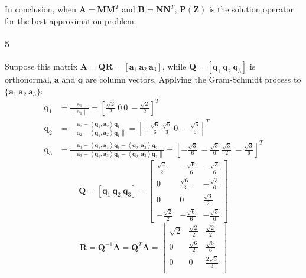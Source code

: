 \documentclass[22pt]{article}
\begin{document}
	In conclusion, when $\mathbf{A = MM}^T$ and $\mathbf{B=NN}^T$, $\mathbf{P(Z)}$ is the solution operator for the best approximation problem.

	\paragraph{5} Suppose this matrix $\mathbf{A} = \mathbf{QR} = [\mathbf{a}_1\ \mathbf{a}_2\ \mathbf{a}_3]$, while $\mathbf{Q} = [\mathbf{q}_1\ \mathbf{q}_2\ \mathbf{q}_3]$ is orthonormal, $\mathbf{a}$ and $\mathbf{q}$ are column vectors. Applying the Gram-Schmidt process to $\{\mathbf{a}_1\ \mathbf{a}_2\ \mathbf{a}_3\}$:
	\begin{align}
		\mathbf{q}_1 & = \frac{\mathbf{a}_1}{\left\|\mathbf{a}_1\right\|} = [\frac{\sqrt{2}}{2}\ 0\ 0\ -\frac{\sqrt{2}}{2}]^T \\
		\mathbf{q}_2 & = \frac{\mathbf{a}_2- \left \langle\mathbf{q}_1,\mathbf{a}_2\right \rangle\mathbf{q}_1}{\left\|\mathbf{a}_2- \left \langle\mathbf{q}_1,\mathbf{a}_2\right \rangle\mathbf{q}_1\right\|} = [-\frac{\sqrt{6}}{6}\ \frac{\sqrt{6}}{3}\ 0\ -\frac{\sqrt{6}}{6}]^T\\
		\mathbf{q}_3 & = \frac{\mathbf{a}_3- \left \langle\mathbf{q}_1,\mathbf{a}_3\right \rangle\mathbf{q}_1-\left \langle\mathbf{q}_2,\mathbf{a}_3\right \rangle\mathbf{q}_2}{\left\|\mathbf{a}_3- \left \langle\mathbf{q}_1,\mathbf{a}_3\right \rangle\mathbf{q}_1-\left \langle\mathbf{q}_2,\mathbf{a}_3\right \rangle\mathbf{q}_2 \right\|} = [-\frac{\sqrt{3}}{6}\ -\frac{\sqrt{3}}{6}\ \frac{\sqrt{3}}{2}\ -\frac{\sqrt{3}}{6}]^T
		\end{align}
	\begin{equation}
	\renewcommand\arraystretch{1.5}
	\mathbf{Q}  = [\mathbf{q}_1\ \mathbf{q}_2\ \mathbf{q}_3] = \left[\begin{array}{ccc} \frac{\sqrt{2}}{2} & -\frac{\sqrt{6}}{6} & -\frac{\sqrt{3}}{6}\\ 0 & \frac{\sqrt{6}}{3} & -\frac{\sqrt{3}}{6} \\ 0&0&\frac{\sqrt{3}}{2}\\ -\frac{\sqrt{2}}{2}&-\frac{\sqrt{6}}{6}& -\frac{\sqrt{3}}{6} \end{array}\right]
		\end{equation}
		\begin{equation}
	\renewcommand\arraystretch{1.5}
	\mathbf{R} = \mathbf{Q}^{-1}\mathbf{A} = \mathbf{Q}^T\mathbf{A} = \left[\begin{array}{ccc} \sqrt{2} &\frac{\sqrt{2}}{2} & \frac{\sqrt{2}}{2} \\ 0 & \frac{\sqrt{6}}{2} & \frac{\sqrt{6}}{6} \\ 0 & 0 & \frac{2\sqrt{3}}{3}\\\end{array}\right]
		\end{equation}
\end{document}
